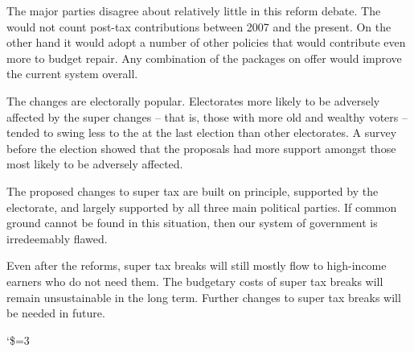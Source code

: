 \documentclass[continuous]{grattan}\usepackage[]{graphicx}\usepackage[]{color}
\begin{document}
\begin{overview}[-2.2\baselineskip]
The major parties disagree about relatively little in this reform debate. 
The \ALP{} would not count post-tax contributions between 2007 and the present. 
On the other hand it would adopt a number of other policies that would contribute even more to budget repair. 
Any combination of the packages on offer would improve the current system overall. 

The changes are electorally popular. 
Electorates more likely to be adversely affected by the super changes – that is, those with more old and wealthy voters – tended to swing less to the \ALP{} at the last election than other electorates. 
A survey before the election showed that the proposals had more support amongst those most likely to be adversely affected.

The proposed changes to super tax are built on principle, supported by the electorate, and largely supported by all three main political parties. 
If common ground cannot be found in this situation, then our system of government is irredeemably flawed. 

Even after the reforms, super tax breaks will still mostly flow to high-income earners who do not need them. 
The budgetary costs of super tax breaks will remain unsustainable in the long term.
Further changes to super tax breaks will be needed in future.
\end{overview}
\addtolength{\columnsep}{-3.6mm}

\onecolumn
\thispagestyle{empty}
\catcode`\$=3







\twocolumn
{}  %
\end{document}
